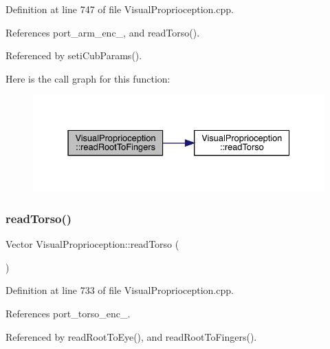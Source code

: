 Definition at line 747 of file Visual\+Proprioception.\+cpp.



References port\+\_\+arm\+\_\+enc\+\_\+, and read\+Torso().



Referenced by seti\+Cub\+Params().

Here is the call graph for this function\+:
\nopagebreak
\begin{figure}[H]
\begin{center}
\leavevmode
\includegraphics[width=331pt]{classVisualProprioception_af3370849532d77174f5848f415c08e9e_cgraph}
\end{center}
\end{figure}
\mbox{\label{classVisualProprioception_a3bf5b9321ccf560bb3955cbe17fc5cab}} 
\subsubsection{\texorpdfstring{read\+Torso()}{readTorso()}}
{\footnotesize\ttfamily Vector Visual\+Proprioception\+::read\+Torso (\begin{DoxyParamCaption}{ }\end{DoxyParamCaption})\hspace{0.3cm}{\ttfamily [protected]}}



Definition at line 733 of file Visual\+Proprioception.\+cpp.



References port\+\_\+torso\+\_\+enc\+\_\+.



Referenced by read\+Root\+To\+Eye(), and read\+Root\+To\+Fingers().

\mbox{\label{classVisualProprioception_afe0bc2a5d6fea18d75764ed12755f3ee}} 
